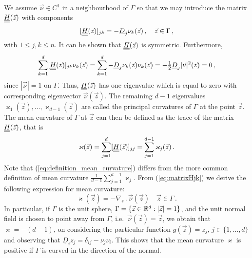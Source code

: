 We assume $\vec{\nu} \in C^1$ in a neighbourhood of $\Gamma$ so that we
may introduce the matrix $\mat H(\vec z)$ with components
\begin{equation}\label{eq:matrixHjk}
[\mat H (\vec z)]_{jk} = - \underline{D}_j \nu_k (\vec z)\,, \quad \vec z \in
\Gamma \, ,
\end{equation}
with $1\leq j,k\leq n$. It can be shown that $\mat H(\vec z)$ is symmetric.
Furthermore,
\begin{equation}
\sum_{k = 1}^{d} [\mat H(\vec z)]_{jk} \nu_k (\vec z) =
\sum_{k = 1}^{d} - \underline{D}_j \nu_k (\vec z) \nu_k (\vec z) =
- \tfrac{1}{2} \underline{D}_j |\vec{\nu}|^2 (\vec z) = 0 \, ,
\end{equation}
since $|\vec{\nu}| = 1$ on $\Gamma$. Thus, $\mat H(\vec z)$ has one
eigenvalue which is equal to zero with corresponding eigenvector
$\vec\nu(\vec z)$. The remaining $d - 1$ eigenvalues $\varkappa_1 (\vec z),
\hdots, \varkappa_{d - 1} (\vec z)$ are called the principal curvatures of
$\Gamma$ at the point $\vec z$. The mean curvature of $\Gamma$ at $\vec z$
can then be defined as the trace of the matrix $\mat H(\vec z)$, that is
\begin{equation}\label{eq:definition_mean_curvature}
\varkappa (\vec z) = \sum_{j = 1}^{d} [\mat H(\vec z)]_{jj} = \sum_{j = 1}^{d -
1} \varkappa_j (\vec z) \,.
\end{equation}
Note that (\ref{eq:definition_mean_curvature}) differs from the more common
definition of mean curvature $\frac{1}{d - 1} \sum_{j = 1}^{d - 1} \varkappa_j$.
From (\ref{eq:matrixHjk}) we derive the following expression for mean
curvature:
\begin{equation}
\varkappa (\vec z)=-\nabla_s \,.\, \vec{\nu}(\vec z) \quad \vec z \in \Gamma\,.
\end{equation}
In particular, if $\Gamma$ is the unit sphere,
$\Gamma = \{ \vec z \in {\mathbb R}^d : |\vec z| = 1 \}$,
and the unit normal field is chosen to point away from $\Gamma$,
i.e.~$\vec\nu(\vec z) = \vec z$, we obtain that $\varkappa = -
(d - 1)$, on considering the particular function $g(\vec z) = z_j$, $j \in \{
1, \hdots, d \}$ and observing that $\underline{D}_i z_j = \delta_{ij} - \nu_j
\nu_i$. This shows that the mean curvature $\varkappa$ is positive if $\Gamma$
is curved in the direction of the normal.

